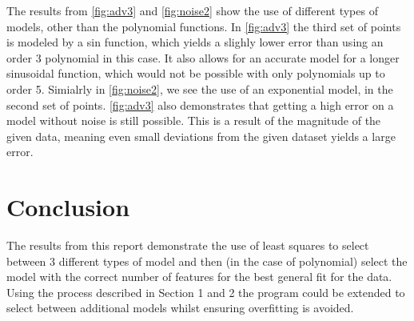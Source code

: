 \documentclass[]{article}
\begin{document}
The results from \ref{fig:adv3}  and \ref{fig:noise2} show the use of different
types of models, other than the polynomial functions. In \ref{fig:adv3} the
third set of points is modeled by a sin function, which yields a slighly lower
error than using an order 3 polynomial in this case. It also allows for an
accurate model for a longer sinusoidal function, which would not be possible
with only polynomials up to order 5. Simialrly in
\ref{fig:noise2}, we see the use of an exponential model, in the second set of
points. \ref{fig:adv3} also demonstrates that getting a high error on a model
without noise is still possible. This is a result of the magnitude of the given
data, meaning even small deviations from the given dataset yields a large error.

\section{Conclusion}
The results from this report demonstrate the use of least squares to select
between 3 different types of model and then (in the case of polynomial) select
the model with the correct number of features for the best general fit for the data.
Using the process described in Section 1 and 2 the program could be extended to
select between additional models whilst ensuring overfitting is avoided.
\end{document}
